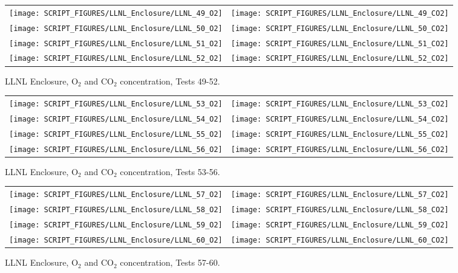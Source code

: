\begin{figure}[p]
\begin{tabular*}{\textwidth}{l@{\extracolsep{\fill}}r}
\texttt{[image: SCRIPT\_FIGURES/LLNL\_Enclosure/LLNL\_49\_O2]} &
\texttt{[image: SCRIPT\_FIGURES/LLNL\_Enclosure/LLNL\_49\_CO2]} \\
\texttt{[image: SCRIPT\_FIGURES/LLNL\_Enclosure/LLNL\_50\_O2]} &
\texttt{[image: SCRIPT\_FIGURES/LLNL\_Enclosure/LLNL\_50\_CO2]} \\
\texttt{[image: SCRIPT\_FIGURES/LLNL\_Enclosure/LLNL\_51\_O2]} &
\texttt{[image: SCRIPT\_FIGURES/LLNL\_Enclosure/LLNL\_51\_CO2]} \\
\texttt{[image: SCRIPT\_FIGURES/LLNL\_Enclosure/LLNL\_52\_O2]} &
\texttt{[image: SCRIPT\_FIGURES/LLNL\_Enclosure/LLNL\_52\_CO2]}
\end{tabular*}
\caption{LLNL Enclosure, O$_2$ and CO$_2$ concentration, Tests 49-52.}
\label{LLNL_Gas_13}
\end{figure}

\begin{figure}[p]
\begin{tabular*}{\textwidth}{l@{\extracolsep{\fill}}r}
\texttt{[image: SCRIPT\_FIGURES/LLNL\_Enclosure/LLNL\_53\_O2]} &
\texttt{[image: SCRIPT\_FIGURES/LLNL\_Enclosure/LLNL\_53\_CO2]} \\
\texttt{[image: SCRIPT\_FIGURES/LLNL\_Enclosure/LLNL\_54\_O2]} &
\texttt{[image: SCRIPT\_FIGURES/LLNL\_Enclosure/LLNL\_54\_CO2]} \\
\texttt{[image: SCRIPT\_FIGURES/LLNL\_Enclosure/LLNL\_55\_O2]} &
\texttt{[image: SCRIPT\_FIGURES/LLNL\_Enclosure/LLNL\_55\_CO2]} \\
\texttt{[image: SCRIPT\_FIGURES/LLNL\_Enclosure/LLNL\_56\_O2]} &
\texttt{[image: SCRIPT\_FIGURES/LLNL\_Enclosure/LLNL\_56\_CO2]}
\end{tabular*}
\caption{LLNL Enclosure, O$_2$ and CO$_2$ concentration, Tests 53-56.}
\label{LLNL_Gas_14}
\end{figure}

\begin{figure}[p]
\begin{tabular*}{\textwidth}{l@{\extracolsep{\fill}}r}
\texttt{[image: SCRIPT\_FIGURES/LLNL\_Enclosure/LLNL\_57\_O2]} &
\texttt{[image: SCRIPT\_FIGURES/LLNL\_Enclosure/LLNL\_57\_CO2]} \\
\texttt{[image: SCRIPT\_FIGURES/LLNL\_Enclosure/LLNL\_58\_O2]} &
\texttt{[image: SCRIPT\_FIGURES/LLNL\_Enclosure/LLNL\_58\_CO2]} \\
\texttt{[image: SCRIPT\_FIGURES/LLNL\_Enclosure/LLNL\_59\_O2]} &
\texttt{[image: SCRIPT\_FIGURES/LLNL\_Enclosure/LLNL\_59\_CO2]} \\
\texttt{[image: SCRIPT\_FIGURES/LLNL\_Enclosure/LLNL\_60\_O2]} &
\texttt{[image: SCRIPT\_FIGURES/LLNL\_Enclosure/LLNL\_60\_CO2]}
\end{tabular*}
\caption{LLNL Enclosure, O$_2$ and CO$_2$ concentration, Tests 57-60.}
\label{LLNL_Gas_15}
\end{figure}

